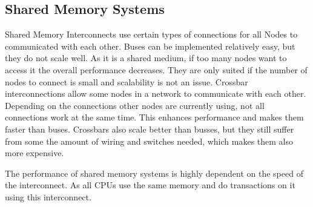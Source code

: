 \documentclass{article}
\begin{document}
\subsection{Shared Memory Systems} %
\label{sub:shared_memory_systems}
Shared Memory Interconnects use certain types of connections
for all Nodes to communicated with each other. 
Buses can be implemented relatively easy,
but they do not scale well.
As it is a shared medium,
if too many nodes want to access it the overall performance decreases.
They are only suited if the number of nodes to connect is small and scalability is not an issue.
Crossbar interconnections allow some nodes in a network to communicate with each other.
Depending on the connections other nodes are currently using,
not all connections work at the same time.
This enhances performance and makes them faster than buses.
Crossbars also scale better than busses,
but they still suffer from some the amount of wiring and switches needed,
which makes them also more expensive.

The performance of shared memory systems is highly dependent on the speed of the interconnect. As all CPUs use the same memory and do transactions on it using this interconnect.

\end{document}
